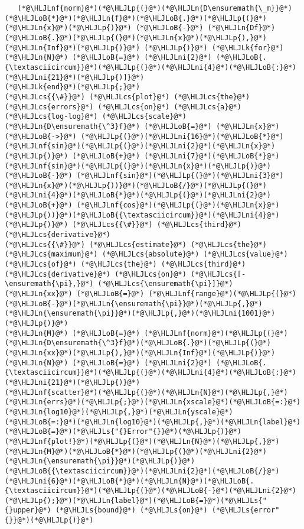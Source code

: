 \documentclass[12pt,a4paper]{article}
\newcommand{\HLJLk}[1]{\textcolor[RGB]{148,91,176}{\textbf{#1}}}
\newcommand{\HLJLn}[1]{#1}
\newcommand{\HLJLnf}[1]{\textcolor[RGB]{66,102,213}{#1}}
\newcommand{\HLJLs}[1]{\textcolor[RGB]{201,61,57}{#1}}
\newcommand{\HLJLni}[1]{\textcolor[RGB]{59,151,46}{#1}}
\newcommand{\HLJLoB}[1]{\textcolor[RGB]{102,102,102}{\textbf{#1}}}
\newcommand{\HLJLp}[1]{#1}
\newcommand{\HLJLcs}[1]{\textcolor[RGB]{153,153,119}{\textit{#1}}}
\begin{document}
\begin{lstlisting}
   (*@\HLJLnf{norm}@*)(*@\HLJLp{(}@*)(*@\HLJLn{D\ensuremath{\_m}}@*)(*@\HLJLoB{*}@*)(*@\HLJLn{f}@*)(*@\HLJLoB{.}@*)(*@\HLJLp{(}@*)(*@\HLJLn{x}@*)(*@\HLJLp{)}@*) (*@\HLJLoB{-}@*) (*@\HLJLn{Df}@*)(*@\HLJLoB{.}@*)(*@\HLJLp{(}@*)(*@\HLJLn{x}@*)(*@\HLJLp{),}@*)(*@\HLJLn{Inf}@*)(*@\HLJLp{)}@*) (*@\HLJLp{)}@*) (*@\HLJLk{for}@*) (*@\HLJLn{N}@*) (*@\HLJLoB{=}@*) (*@\HLJLni{2}@*) (*@\HLJLoB{.{\textasciicircum}}@*)(*@\HLJLp{(}@*)(*@\HLJLni{4}@*)(*@\HLJLoB{:}@*)(*@\HLJLni{21}@*)(*@\HLJLp{)]}@*)
(*@\HLJLk{end}@*)(*@\HLJLp{;}@*)
(*@\HLJLcs{{\#}}@*) (*@\HLJLcs{plot}@*) (*@\HLJLcs{the}@*) (*@\HLJLcs{errors}@*) (*@\HLJLcs{on}@*) (*@\HLJLcs{a}@*) (*@\HLJLcs{log-log}@*) (*@\HLJLcs{scale}@*)
(*@\HLJLn{D\ensuremath{\^3}f}@*) (*@\HLJLoB{=}@*) (*@\HLJLn{x}@*) (*@\HLJLoB{->}@*) (*@\HLJLp{(}@*)(*@\HLJLni{16}@*)(*@\HLJLoB{*}@*)(*@\HLJLnf{sin}@*)(*@\HLJLp{(}@*)(*@\HLJLni{2}@*)(*@\HLJLn{x}@*)(*@\HLJLp{)}@*) (*@\HLJLoB{+}@*) (*@\HLJLni{7}@*)(*@\HLJLoB{*}@*)(*@\HLJLnf{sin}@*)(*@\HLJLp{(}@*)(*@\HLJLn{x}@*)(*@\HLJLp{)}@*) (*@\HLJLoB{-}@*) (*@\HLJLnf{sin}@*)(*@\HLJLp{(}@*)(*@\HLJLni{3}@*)(*@\HLJLn{x}@*)(*@\HLJLp{))}@*)(*@\HLJLoB{/}@*)(*@\HLJLp{(}@*)(*@\HLJLni{4}@*)(*@\HLJLoB{*}@*)(*@\HLJLp{(}@*)(*@\HLJLni{2}@*) (*@\HLJLoB{+}@*) (*@\HLJLnf{cos}@*)(*@\HLJLp{(}@*)(*@\HLJLn{x}@*)(*@\HLJLp{))}@*)(*@\HLJLoB{{\textasciicircum}}@*)(*@\HLJLni{4}@*)(*@\HLJLp{)}@*) (*@\HLJLcs{{\#}}@*) (*@\HLJLcs{third}@*) (*@\HLJLcs{derivative}@*)
(*@\HLJLcs{{\#}}@*) (*@\HLJLcs{estimate}@*) (*@\HLJLcs{the}@*) (*@\HLJLcs{maximum}@*) (*@\HLJLcs{absolute}@*) (*@\HLJLcs{value}@*) (*@\HLJLcs{of}@*) (*@\HLJLcs{the}@*) (*@\HLJLcs{third}@*) (*@\HLJLcs{derivative}@*) (*@\HLJLcs{on}@*) (*@\HLJLcs{[-\ensuremath{\pi},}@*) (*@\HLJLcs{\ensuremath{\pi}]}@*)
(*@\HLJLn{xx}@*) (*@\HLJLoB{=}@*) (*@\HLJLnf{range}@*)(*@\HLJLp{(}@*)(*@\HLJLoB{-}@*)(*@\HLJLn{\ensuremath{\pi}}@*)(*@\HLJLp{,}@*)(*@\HLJLn{\ensuremath{\pi}}@*)(*@\HLJLp{,}@*)(*@\HLJLni{1001}@*)(*@\HLJLp{)}@*)
(*@\HLJLn{M}@*) (*@\HLJLoB{=}@*) (*@\HLJLnf{norm}@*)(*@\HLJLp{(}@*)(*@\HLJLn{D\ensuremath{\^3}f}@*)(*@\HLJLoB{.}@*)(*@\HLJLp{(}@*)(*@\HLJLn{xx}@*)(*@\HLJLp{),}@*)(*@\HLJLn{Inf}@*)(*@\HLJLp{)}@*)
(*@\HLJLn{N}@*) (*@\HLJLoB{=}@*) (*@\HLJLni{2}@*) (*@\HLJLoB{.{\textasciicircum}}@*)(*@\HLJLp{(}@*)(*@\HLJLni{4}@*)(*@\HLJLoB{:}@*)(*@\HLJLni{21}@*)(*@\HLJLp{)}@*)
(*@\HLJLnf{scatter}@*)(*@\HLJLp{(}@*)(*@\HLJLn{N}@*)(*@\HLJLp{,}@*)(*@\HLJLn{errs}@*)(*@\HLJLp{;}@*)(*@\HLJLn{xscale}@*)(*@\HLJLoB{=:}@*)(*@\HLJLn{log10}@*)(*@\HLJLp{,}@*)(*@\HLJLn{yscale}@*)(*@\HLJLoB{=:}@*)(*@\HLJLn{log10}@*)(*@\HLJLp{,}@*)(*@\HLJLn{label}@*)(*@\HLJLoB{=}@*)(*@\HLJLs{"{}Error"{}}@*)(*@\HLJLp{)}@*)
(*@\HLJLnf{plot!}@*)(*@\HLJLp{(}@*)(*@\HLJLn{N}@*)(*@\HLJLp{,}@*)(*@\HLJLn{M}@*)(*@\HLJLoB{*}@*)(*@\HLJLp{(}@*)(*@\HLJLni{2}@*)(*@\HLJLn{\ensuremath{\pi}}@*)(*@\HLJLp{)}@*)(*@\HLJLoB{{\textasciicircum}}@*)(*@\HLJLni{2}@*)(*@\HLJLoB{/}@*)(*@\HLJLni{6}@*)(*@\HLJLoB{*}@*)(*@\HLJLn{N}@*)(*@\HLJLoB{.{\textasciicircum}}@*)(*@\HLJLp{(}@*)(*@\HLJLoB{-}@*)(*@\HLJLni{2}@*)(*@\HLJLp{);}@*)(*@\HLJLn{label}@*)(*@\HLJLoB{=}@*)(*@\HLJLs{"{}upper}@*) (*@\HLJLs{bound}@*) (*@\HLJLs{on}@*) (*@\HLJLs{error"{}}@*)(*@\HLJLp{)}@*)
\end{lstlisting}
\end{document}
